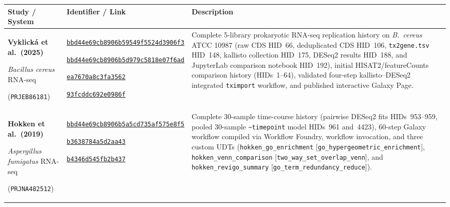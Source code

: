 \documentclass[11pt,letterpaper]{article}
\newcommand{\tool}[1]{\textsf{#1}}
\begin{document}
\begin{table}[!htbp]
\centering
\scriptsize
\renewcommand{\arraystretch}{0.95}
\begin{tabularx}{\textwidth}{p{3.0cm}p{4.8cm}X}
\toprule
\textbf{Study / System} & \textbf{Identifier / Link} & \textbf{Description} \\
\midrule
\textbf{Vyklick{\'a} et al.\ (2025)} \par \textit{Bacillus cereus} RNA-seq \par (\texttt{PRJEB86181}) &
\href{https://usegalaxy.org/histories/view?id=bbd44e69cb8906b59549f5524d3906f3}{\texttt{bbd44e69cb8906b59549f5524d3906f3}} \par
\href{https://usegalaxy.org/histories/view?id=bbd44e69cb8906b5d979c5818e07f6ad}{\texttt{bbd44e69cb8906b5d979c5818e07f6ad}} \par
\href{https://usegalaxy.org/published/workflow?id=ea7670a8c3fa3562}{\texttt{ea7670a8c3fa3562}} \par
\href{https://usegalaxy.org/published/page?id=93fcddc692e0986f}{\texttt{93fcddc692e0986f}} &
Complete 5-library prokaryotic RNA-seq replication history on \textit{B.\ cereus} ATCC 10987 (raw CDS HID~66, deduplicated CDS HID~106, \texttt{tx2gene.tsv} HID~148, \tool{kallisto} collection HID~175, \tool{DESeq2} results HID~188, and JupyterLab comparison notebook HID~192), initial \tool{HISAT2}/\tool{featureCounts} comparison history (HIDs~1--64), validated four-step \tool{kallisto}--\tool{DESeq2} integrated \texttt{tximport} workflow, and published interactive Galaxy Page. \\
\addlinespace
\textbf{Hokken et al.\ (2019)} \par \textit{Aspergillus fumigatus} RNA-seq \par (\texttt{PRJNA482512}) &
\href{https://usegalaxy.org/histories/view?id=bbd44e69cb8906b5a5cd735af575e8f5}{\texttt{bbd44e69cb8906b5a5cd735af575e8f5}} \par
\href{https://usegalaxy.org/published/workflow?id=b3638784a5d2aa43}{\texttt{b3638784a5d2aa43}} \par
\href{https://usegalaxy.org/workflows/invocations/b4346d545fb2b437}{\texttt{b4346d545fb2b437}} &
Complete 30-sample time-course history (pairwise \tool{DESeq2} fits HIDs~953--959, pooled 30-sample \texttt{\textasciitilde timepoint} model HIDs~961 and~4423), 60-step Galaxy workflow compiled via \tool{Workflow Foundry}, workflow invocation, and three custom UDTs (\nolinkurl{hokken_go_enrichment} [\nolinkurl{go_hypergeometric_enrichment}], \nolinkurl{hokken_venn_comparison} [\nolinkurl{two_way_set_overlap_venn}], and \nolinkurl{hokken_revigo_summary} [\nolinkurl{go_term_redundancy_reduce}]). \\

\end{tabularx}
\end{table}
\end{document}
